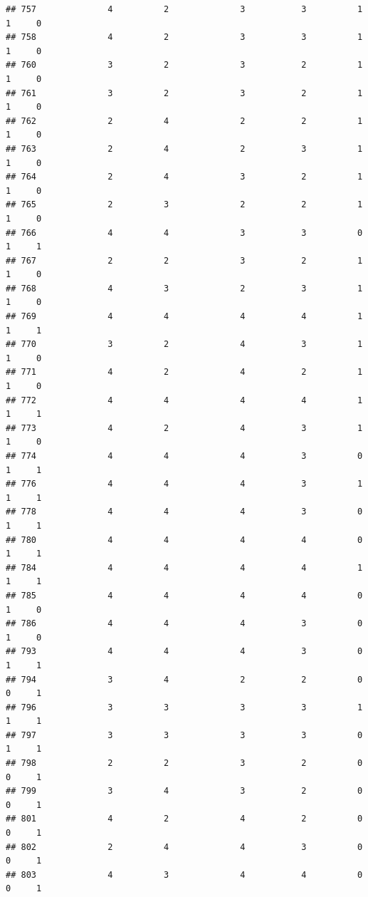 \documentclass[
]{article}
\begin{document}
\begin{verbatim}
## 757              4          2              3           3          1    1     0
## 758              4          2              3           3          1    1     0
## 760              3          2              3           2          1    1     0
## 761              3          2              3           2          1    1     0
## 762              2          4              2           2          1    1     0
## 763              2          4              2           3          1    1     0
## 764              2          4              3           2          1    1     0
## 765              2          3              2           2          1    1     0
## 766              4          4              3           3          0    1     1
## 767              2          2              3           2          1    1     0
## 768              4          3              2           3          1    1     0
## 769              4          4              4           4          1    1     1
## 770              3          2              4           3          1    1     0
## 771              4          2              4           2          1    1     0
## 772              4          4              4           4          1    1     1
## 773              4          2              4           3          1    1     0
## 774              4          4              4           3          0    1     1
## 776              4          4              4           3          1    1     1
## 778              4          4              4           3          0    1     1
## 780              4          4              4           4          0    1     1
## 784              4          4              4           4          1    1     1
## 785              4          4              4           4          0    1     0
## 786              4          4              4           3          0    1     0
## 793              4          4              4           3          0    1     1
## 794              3          4              2           2          0    0     1
## 796              3          3              3           3          1    1     1
## 797              3          3              3           3          0    1     1
## 798              2          2              3           2          0    0     1
## 799              3          4              3           2          0    0     1
## 801              4          2              4           2          0    0     1
## 802              2          4              4           3          0    0     1
## 803              4          3              4           4          0    0     1

\end{verbatim}
\end{document}
